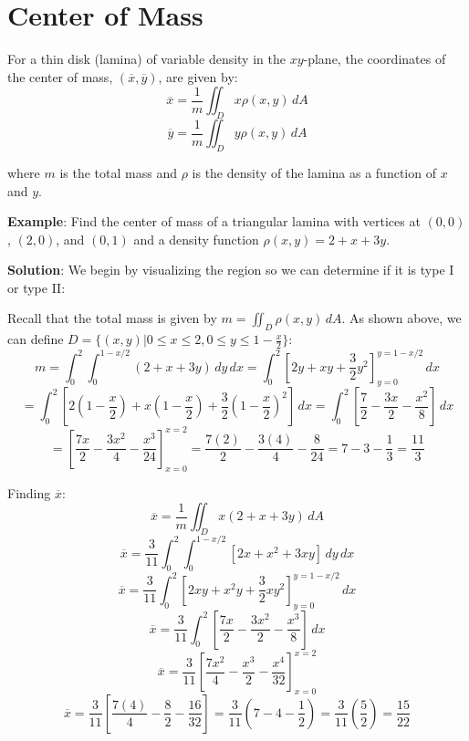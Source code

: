 \section{Center of Mass}
For a thin disk (lamina) of variable density in the $xy$-plane, the coordinates
of the center of mass, $(\overline{x}, \overline{y})$, are given by:
$$\overline{x} = \frac{1}{m} \iint_{\textit{D}} x \rho (x, y)\,dA$$
$$\overline{y} = \frac{1}{m} \iint_{\textit{D}} y \rho (x, y)\,dA$$

where $m$ is the total mass and $\rho$ is the density of the lamina as a 
function of $x$ and $y$. 

\textbf{Example}: Find the center of mass of a triangular lamina with vertices 
at $(0, 0)$, $(2, 0)$, and $(0, 1)$ and a density function $\rho (x, y) = 2 + 
x + 3y$. 

\textbf{Solution}: We begin by visualizing the region so we can determine if 
it is type I or type II:


Recall that the total mass is given by $m = \iint_{\textit{D}} \rho (x, y)
\,dA$. As shown above, we can define $\textit{D} = \{ \left( x, y \right) | 0 
\leq x \leq 2, 0 \leq y \leq 1 - \frac{x}{2} \}$:
$$m = \int_{0}^{2} \int_{0}^{1 - x/2} \left( 2 + x + 3y \right) \,dy \,dx = 
\int_{0}^2 \left[2y + xy + \frac{3}{2}y^2 \right]_{y = 0}^{y = 1 - x/2}\,dx$$
$$= \int_0^2 \left[ 2(1 - \frac{x}{2}) + x(1 - \frac{x}{2}) + \frac{3}{2} (1 - 
\frac{x}{2})^2 \right]\,dx = \int_0^2 \left[ \frac{7}{2} - \frac{3x}{2} - 
\frac{x^2}{8} \right]\,dx$$
$$= \left[ \frac{7x}{2} - \frac{3x^2}{4} - \frac{x^3}{24} \right]_{x = 0}^{x = 
2} = \frac{7(2)}{2} - \frac{3(4)}{4} - \frac{8}{24} = 7 - 3 - \frac{1}{3} = 
\frac{11}{3}$$

Finding $\overline{x}$:
$$\overline{x} = \frac{1}{m} \iint_{\textit{D}} x \left( 2 + x + 3y \right) 
\,dA$$
$$\overline{x} = \frac{3}{11} \int_0^2 \int_0^{1 - x/2} \left[ 2x + x^2 + 3xy 
\right] \,dy \,dx$$
$$\overline{x} = \frac{3}{11} \int_0^2 \left[ 2xy + x^2y + \frac{3}{2}xy^2 
\right]_{y = 0}^{y = 1 - x/2} \,dx$$
$$\overline{x} = \frac{3}{11} \int_0^2 \left[ \frac{7x}{2} - \frac{3x^2}{2} - 
\frac{x^3}{8} \right]\,dx$$
$$\overline{x} = \frac{3}{11} \left[ \frac{7x^2}{4} - \frac{x^3}{2} - \frac{x
^4}{32} \right]_{x = 0}^{x = 2}$$
$$\overline{x} = \frac{3}{11} \left[ \frac{7(4)}{4} - \frac{8}{2} - \frac{16}{
32} \right] = \frac{3}{11} \left( 7 - 4 - \frac{1}{2} \right) = \frac{3}{11} 
\left( \frac{5}{2} \right) = \frac{15}{22}$$

